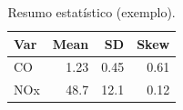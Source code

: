 \begin{table}[t]
  \centering
  \caption{Resumo estatístico (exemplo).}
  \label{tab:summary}
  \begin{tabular}{lrrr}
    \toprule
    Var & Mean & SD & Skew \\
    \midrule
    CO  & 1.23 & 0.45 & 0.61 \\
    NOx & 48.7 & 12.1 & 0.12 \\
    \bottomrule
  \end{tabular}
\end{table}
